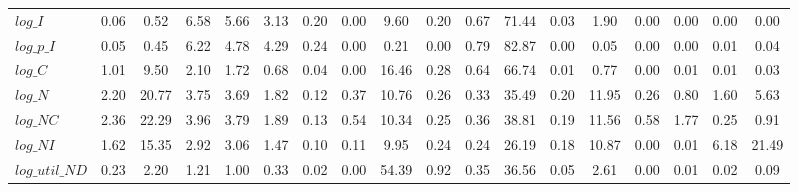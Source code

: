 \begin{center}
\begin{longtable}{lccccccccccccccccc}
$log\_I         $	 & 	            0.06	 & 	            0.52	 & 	            6.58	 & 	            5.66	 & 	            3.13	 & 	            0.20	 & 	            0.00	 & 	            9.60	 & 	            0.20	 & 	            0.67	 & 	           71.44	 & 	            0.03	 & 	            1.90	 & 	            0.00	 & 	            0.00	 & 	            0.00	 & 	            0.00 \\ 
$log\_p\_I      $	 & 	            0.05	 & 	            0.45	 & 	            6.22	 & 	            4.78	 & 	            4.29	 & 	            0.24	 & 	            0.00	 & 	            0.21	 & 	            0.00	 & 	            0.79	 & 	           82.87	 & 	            0.00	 & 	            0.05	 & 	            0.00	 & 	            0.00	 & 	            0.01	 & 	            0.04 \\ 
$log\_C         $	 & 	            1.01	 & 	            9.50	 & 	            2.10	 & 	            1.72	 & 	            0.68	 & 	            0.04	 & 	            0.00	 & 	           16.46	 & 	            0.28	 & 	            0.64	 & 	           66.74	 & 	            0.01	 & 	            0.77	 & 	            0.00	 & 	            0.01	 & 	            0.01	 & 	            0.03 \\ 
$log\_N         $	 & 	            2.20	 & 	           20.77	 & 	            3.75	 & 	            3.69	 & 	            1.82	 & 	            0.12	 & 	            0.37	 & 	           10.76	 & 	            0.26	 & 	            0.33	 & 	           35.49	 & 	            0.20	 & 	           11.95	 & 	            0.26	 & 	            0.80	 & 	            1.60	 & 	            5.63 \\ 
$log\_NC        $	 & 	            2.36	 & 	           22.29	 & 	            3.96	 & 	            3.79	 & 	            1.89	 & 	            0.13	 & 	            0.54	 & 	           10.34	 & 	            0.25	 & 	            0.36	 & 	           38.81	 & 	            0.19	 & 	           11.56	 & 	            0.58	 & 	            1.77	 & 	            0.25	 & 	            0.91 \\ 
$log\_NI        $	 & 	            1.62	 & 	           15.35	 & 	            2.92	 & 	            3.06	 & 	            1.47	 & 	            0.10	 & 	            0.11	 & 	            9.95	 & 	            0.24	 & 	            0.24	 & 	           26.19	 & 	            0.18	 & 	           10.87	 & 	            0.00	 & 	            0.01	 & 	            6.18	 & 	           21.49 \\ 
$log\_util\_ND  $	 & 	            0.23	 & 	            2.20	 & 	            1.21	 & 	            1.00	 & 	            0.33	 & 	            0.02	 & 	            0.00	 & 	           54.39	 & 	            0.92	 & 	            0.35	 & 	           36.56	 & 	            0.05	 & 	            2.61	 & 	            0.00	 & 	            0.01	 & 	            0.02	 & 	            0.09 \\ 

\end{longtable}
\end{center}

